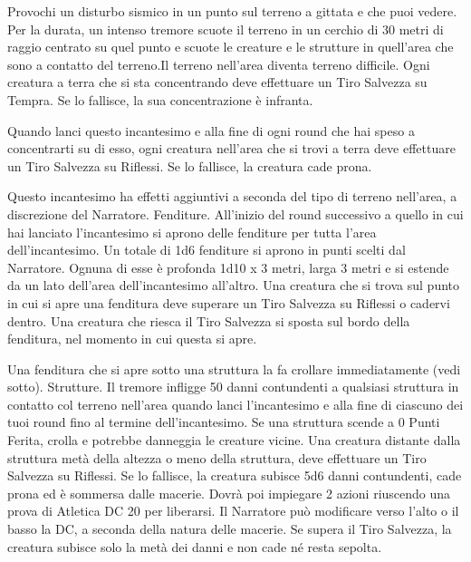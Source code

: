 \begin{multicols}{2}
Provochi un disturbo sismico in un punto sul terreno a gittata e che puoi vedere. Per la durata, un intenso tremore scuote il terreno in un cerchio di 30 metri di raggio centrato su quel punto e scuote le creature e le strutture in quell'area che sono a contatto del terreno.Il terreno nell'area diventa terreno difficile. Ogni creatura a terra che si sta concentrando deve effettuare un Tiro Salvezza su Tempra. Se lo fallisce, la sua concentrazione è infranta.

Quando lanci questo incantesimo e alla fine di ogni round che hai speso a concentrarti su di esso, ogni creatura nell'area che si trovi a terra deve effettuare un Tiro Salvezza su Riflessi. Se lo fallisce, la creatura cade prona.

Questo incantesimo ha effetti aggiuntivi a seconda del tipo di terreno nell'area, a discrezione del Narratore. Fenditure. All'inizio del round successivo a quello in cui hai lanciato l'incantesimo si aprono delle fenditure per tutta l'area dell'incantesimo. Un totale di 1d6 fenditure si aprono in punti scelti dal Narratore. Ognuna di esse è profonda 1d10 x 3 metri, larga 3 metri e si estende da un lato dell'area dell'incantesimo all'altro. Una creatura che si trova sul punto in cui si apre una fenditura deve superare un Tiro Salvezza su Riflessi o cadervi dentro. Una creatura che riesca il Tiro Salvezza si sposta sul bordo della fenditura, nel momento in cui questa si apre.

Una fenditura che si apre sotto una struttura la fa crollare immediatamente (vedi sotto). Strutture. Il tremore infligge 50 danni contundenti a qualsiasi struttura in contatto col terreno nell'area quando lanci l'incantesimo e alla fine di ciascuno dei tuoi round fino al termine dell'incantesimo. Se una struttura scende a 0 Punti Ferita, crolla e potrebbe danneggia le creature vicine. Una creatura distante dalla struttura metà della altezza o meno della struttura, deve effettuare un Tiro Salvezza su Riflessi. Se lo fallisce, la creatura subisce 5d6 danni contundenti, cade prona ed è sommersa dalle macerie. Dovrà poi impiegare 2 azioni riuscendo una prova di Atletica DC 20 per liberarsi. Il Narratore può modificare verso l'alto o il basso la DC, a seconda della natura delle macerie. Se supera il Tiro Salvezza, la creatura subisce solo la metà dei danni e non cade né resta sepolta.


\end{multicols}
